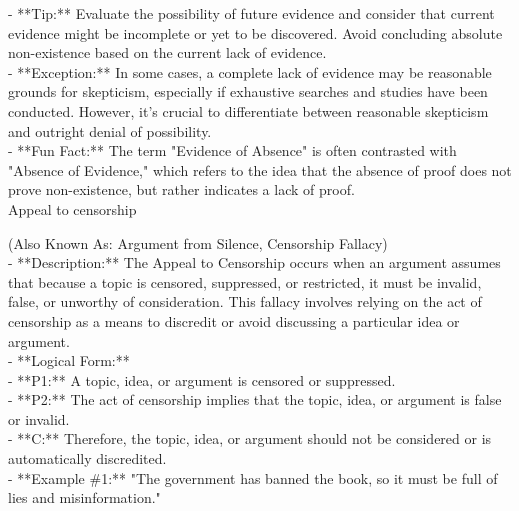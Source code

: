 \documentclass[a4paper,12pt,single,pdftex]{scrbook}
\begin{document}
    
      - **Tip:** Evaluate the possibility of future evidence and consider that current evidence might be incomplete or yet to be discovered. Avoid concluding absolute non-existence based on the current lack of evidence.
    \\

    
      - **Exception:** In some cases, a complete lack of evidence may be reasonable grounds for skepticism, especially if exhaustive searches and studies have been conducted. However, it’s crucial to differentiate between reasonable skepticism and outright denial of possibility.
    \\

    
      - **Fun Fact:** The term "Evidence of Absence" is often contrasted with "Absence of Evidence," which refers to the idea that the absence of proof does not prove non-existence, but rather indicates a lack of proof.
    \\

  

Appeal to censorship
    
      (Also Known As: Argument from Silence, Censorship Fallacy)
    \\

  
    
      - **Description:** The Appeal to Censorship occurs when an argument assumes that because a topic is censored, suppressed, or restricted, it must be invalid, false, or unworthy of consideration. This fallacy involves relying on the act of censorship as a means to discredit or avoid discussing a particular idea or argument.
    \\

    
      - **Logical Form:**
    \\

    
        - **P1:** A topic, idea, or argument is censored or suppressed.
    \\

    
        - **P2:** The act of censorship implies that the topic, idea, or argument is false or invalid.
    \\

    
        - **C:** Therefore, the topic, idea, or argument should not be considered or is automatically discredited.
    \\

    
      - **Example \#1:** "The government has banned the book, so it must be full of lies and misinformation."
    \\
\end{document}
